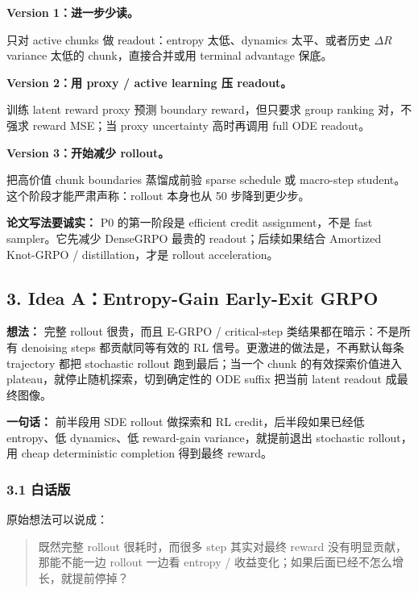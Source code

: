 \textbf{Version 1：进一步少读。}

只对 active chunks 做 readout：entropy 太低、dynamics 太平、或者历史 \(\Delta R\) variance 太低的 chunk，直接合并或用 terminal advantage 保底。

\textbf{Version 2：用 proxy / active learning 压 readout。}

训练 latent reward proxy 预测 boundary reward，但只要求 group ranking 对，不强求 reward MSE；当 proxy uncertainty 高时再调用 full ODE readout。

\textbf{Version 3：开始减少 rollout。}

把高价值 chunk boundaries 蒸馏成前验 sparse schedule 或 macro-step student。这个阶段才能严肃声称：rollout 本身也从 50 步降到更少步。

\begin{warnbox}
\textbf{论文写法要诚实：} P0 的第一阶段是 efficient credit assignment，不是 fast sampler。它先减少 DenseGRPO 最贵的 readout；后续如果结合 Amortized Knot-GRPO / distillation，才是 rollout acceleration。
\end{warnbox}

\subsection{3. Idea A：Entropy-Gain Early-Exit GRPO}

\begin{conceptbox}
\textbf{想法：}
完整 rollout 很贵，而且 E-GRPO / critical-step 类结果都在暗示：不是所有 denoising steps 都贡献同等有效的 RL 信号。更激进的做法是，不再默认每条 trajectory 都把 stochastic rollout 跑到最后；当一个 chunk 的有效探索价值进入 plateau，就停止随机探索，切到确定性的 ODE suffix 把当前 latent readout 成最终图像。

\textbf{一句话：} 前半段用 SDE rollout 做探索和 RL credit，后半段如果已经低 entropy、低 dynamics、低 reward-gain variance，就提前退出 stochastic rollout，用 cheap deterministic completion 得到最终 reward。
\end{conceptbox}

\subsubsection{3.1 白话版}

原始想法可以说成：

\begin{quote}
既然完整 rollout 很耗时，而很多 step 其实对最终 reward 没有明显贡献，那能不能一边 rollout 一边看 entropy / 收益变化；如果后面已经不怎么增长，就提前停掉？
\end{quote}

